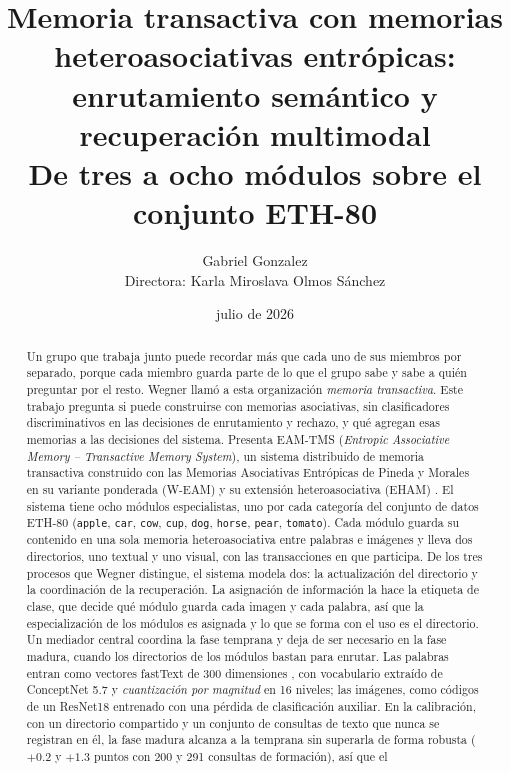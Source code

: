 \documentclass[11pt]{article}
\title{%
    \textbf{Memoria transactiva con memorias heteroasociativas entrópicas:}\\
    \textbf{enrutamiento semántico y recuperación multimodal}\\[0.3em]
    \large De tres a ocho módulos sobre el conjunto ETH-80\\[0.5em]
}
\author{Gabriel Gonzalez\\[0.4em]\small Directora: Karla Miroslava Olmos Sánchez}
\date{julio de 2026}
\begin{document}
\maketitle

\begin{abstract}
Un grupo que trabaja junto puede recordar más que cada uno de sus miembros por separado,
porque cada miembro guarda parte de lo que el grupo sabe y sabe a quién preguntar por el
resto.
Wegner \cite{wegner1987transactive} llamó a esta organización \emph{memoria
transactiva}.
Este trabajo pregunta si puede construirse con memorias asociativas, sin clasificadores
discriminativos en las decisiones de enrutamiento y rechazo, y qué agregan esas memorias
a las decisiones del sistema.
Presenta EAM-TMS (\textit{Entropic Associative Memory -- Transactive Memory System}), un
sistema distribuido de memoria transactiva construido con las Memorias Asociativas
Entrópicas de Pineda y Morales en su variante ponderada (W-EAM)
\cite{pineda2021entropic,pineda2022weighted} y su extensión heteroasociativa (EHAM)
\cite{morales2025missing}.
El sistema tiene ocho módulos especialistas, uno por cada categoría del conjunto de datos
ETH-80 \cite{leibe2003eth80}
(\texttt{apple}, \texttt{car}, \texttt{cow}, \texttt{cup}, \texttt{dog}, \texttt{horse},
\texttt{pear}, \texttt{tomato}).
Cada módulo guarda su contenido en una sola memoria heteroasociativa entre palabras e
imágenes y lleva dos directorios, uno textual y uno visual, con las transacciones en que
participa.
De los tres procesos que Wegner \cite{wegner1995computer} distingue, el sistema modela
dos: la actualización del directorio y la coordinación de la recuperación.
La asignación de información la hace la etiqueta de clase, que decide qué módulo guarda
cada imagen y cada palabra, así que la especialización de los módulos es asignada y lo
que se forma con el uso es el directorio.
Un mediador central coordina la fase temprana y deja de ser necesario en la fase madura,
cuando los directorios de los módulos bastan para enrutar.
Las palabras entran como vectores fastText de 300 dimensiones
\cite{bojanowski2017fasttext}, con vocabulario extraído de ConceptNet 5.7
\cite{speer2017conceptnet} y \emph{cuantización por magnitud} en 16 niveles; las
imágenes, como códigos de un ResNet18 \cite{he2016resnet} entrenado con una pérdida de
clasificación auxiliar.
En la calibración, con un directorio compartido y un conjunto de consultas de texto que
nunca se registran en él, la fase madura alcanza a la temprana sin superarla de forma
robusta ($+0.2$ y $+1.3$ puntos con 200 y 291 consultas de formación), así que el

\end{abstract}
\end{document}
